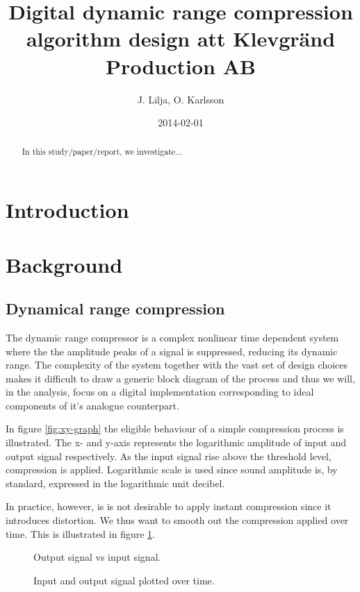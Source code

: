 \documentclass[]{article}
\begin{document}
\title{Digital dynamic range compression algorithm design att Klevgränd Production AB}
\author{J. Lilja, O. Karlsson}
\date{2014-02-01}
\maketitle

\begin{abstract}
In this study/paper/report, we investigate...
\end{abstract}

\clearpage
\section{Introduction}
\section{Background}
\subsection{Dynamical range compression}
The dynamic range compressor is a complex nonlinear time dependent system where the the amplitude peaks of a signal is suppressed, reducing its dynamic range. The complexity of the system together with the vast set of design choices makes it difficult to draw a generic block diagram of the process\cite{giannoullis}  and thus we will, in the analysis, focus on a digital implementation corresponding to ideal components of it's analogue counterpart. 

In figure \ref{fig:xy-graph} the eligible behaviour of a simple compression process is illustrated. The x- and y-axis represents the logarithmic amplitude of input and output signal respectively. As the input signal rise above the threshold level, compression is applied. Logarithmic scale is used since sound amplitude is, by standard, expressed in the logarithmic unit decibel.

In practice, however, is is not desirable to apply instant compression since it introduces distortion\cite{giannoullis}. We thus want to smooth out the compression applied over time. This is illustrated in figure \ref{fig:envelope-graph}.

\begin{figure}[ht]
\captionsetup{justification=centering}
\begin{minipage}[t]{.5\textwidth}
 \centering

\caption{Output signal vs input signal.} 
\label{fig:xy-graph}
\end{minipage}%
\begin{minipage}[t]{.5\textwidth}
\centering

\caption{Input and output signal plotted over time. } 
\label{fig:envelope-graph}
\end{minipage}
\end{figure}
\end{document}
